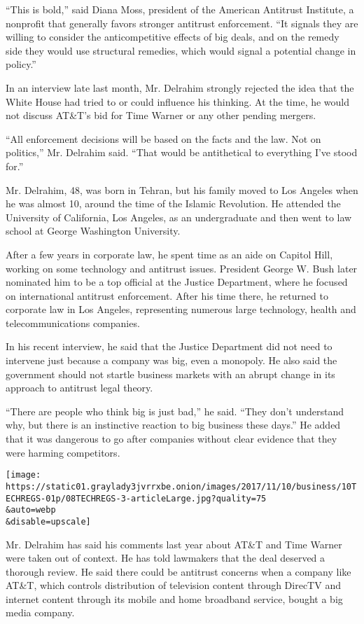 ``This is bold,'' said Diana Moss, president of the American Antitrust
Institute, a nonprofit that generally favors stronger antitrust
enforcement. ``It signals they are willing to consider the
anticompetitive effects of big deals, and on the remedy side they would
use structural remedies, which would signal a potential change in
policy.''

In an interview late last month, Mr. Delrahim strongly rejected the idea
that the White House had tried to or could influence his thinking. At
the time, he would not discuss AT\&T's bid for Time Warner or any other
pending mergers.

``All enforcement decisions will be based on the facts and the law. Not
on politics,'' Mr. Delrahim said. ``That would be antithetical to
everything I've stood for.''

Mr. Delrahim, 48, was born in Tehran, but his family moved to Los
Angeles when he was almost 10, around the time of the Islamic
Revolution. He attended the University of California, Los Angeles, as an
undergraduate and then went to law school at George Washington
University.

After a few years in corporate law, he spent time as an aide on Capitol
Hill, working on some technology and antitrust issues. President George
W. Bush later nominated him to be a top official at the Justice
Department, where he focused on international antitrust enforcement.
After his time there, he returned to corporate law in Los Angeles,
representing numerous large technology, health and telecommunications
companies.

In his recent interview, he said that the Justice Department did not
need to intervene just because a company was big, even a monopoly. He
also said the government should not startle business markets with an
abrupt change in its approach to antitrust legal theory.

``There are people who think big is just bad,'' he said. ``They don't
understand why, but there is an instinctive reaction to big business
these days.'' He added that it was dangerous to go after companies
without clear evidence that they were harming competitors.

\texttt{[image: https://static01.graylady3jvrrxbe.onion/images/2017/11/10/business/10TECHREGS-01p/08TECHREGS-3-articleLarge.jpg?quality=75\\\&auto=webp\\\&disable=upscale]}

Mr. Delrahim has said his comments last year about AT\&T and Time Warner
were taken out of context. He has told lawmakers that the deal deserved
a thorough review. He said there could be antitrust concerns when a
company like AT\&T, which controls distribution of television content
through DirecTV and internet content through its mobile and home
broadband service, bought a big media company.

